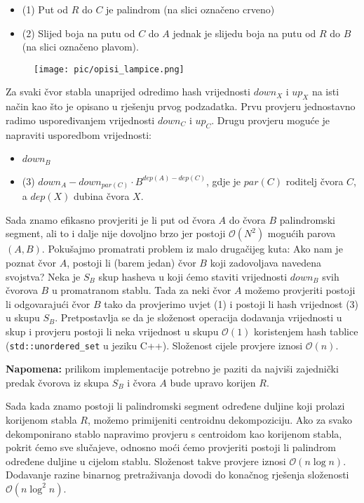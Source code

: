 \documentclass[a4paper]{article}
\begin{document}
\begin{itemize}
  \item (1) Put od $R$ do $C$ je palindrom (na slici označeno crveno)
  \item (2) Slijed boja na putu od $C$ do $A$ jednak je slijedu boja na putu od $R$
    do $B$ (na slici označeno plavom).
\end{itemize}

\begin{figure}[!htbp]
\centering
\texttt{[image: pic/opisi\_lampice.png]}
\end{figure}

Za svaki čvor stabla unaprijed odredimo hash vrijednosti $down_X$ i $up_X$ na
isti način kao što je opisano u rješenju prvog podzadatka. Prvu provjeru
jednostavno radimo uspoređivanjem vrijednosti $down_C$ i $up_C$. Drugu provjeru
moguće je napraviti usporedbom vrijednosti:

\begin{itemize}
  \item $down_B$
  \item (3) $down_A - down_{par(C)} \cdot B^{dep(A)-dep(C)}$, gdje je $par(C)$ roditelj
        čvora $C$, a $dep(X)$ dubina čvora $X$.
\end{itemize}

Sada znamo efikasno provjeriti je li put od čvora $A$ do čvora $B$ palindromski
segment, ali to i dalje nije dovoljno brzo jer postoji $\mathcal{O}(N^2)$
mogućih parova $(A, B)$. Pokušajmo promatrati problem iz malo drugačijeg kuta:
Ako nam je poznat čvor $A$, postoji li (barem jedan) čvor $B$ koji zadovoljava
navedena svojstva?  Neka je $S_B$ skup hasheva u koji ćemo staviti vrijednosti
$down_B$ svih čvorova $B$ u promatranom stablu. Tada za neki čvor $A$ možemo
provjeriti postoji li odgovarajući čvor $B$ tako da provjerimo uvjet (1) i
postoji li hash vrijednost (3) u skupu $S_B$. Pretpostavlja se da je složenost
operacija dodavanja vrijednosti u skup i provjeru postoji li neka vrijednost u
skupu $\mathcal{O}(1)$ koristenjem hash tablice (\texttt{std::unordered\_set} u
jeziku C++). Složenost cijele provjere iznosi $\mathcal{O}(n)$.

\textbf{Napomena:} prilikom implementacije potrebno je paziti da najviši
zajednički predak čvorova iz skupa $S_B$ i čvora $A$ bude upravo korijen $R$.

Sada kada znamo postoji li palindromski segment određene duljine koji prolazi
korijenom stabla $R$, možemo primijeniti centroidnu dekompoziciju. Ako za svako
dekomponirano stablo napravimo provjeru s centroidom kao korijenom stabla,
pokrit ćemo sve slučajeve, odnosno moći ćemo provjeriti postoji li palindrom
određene duljine u cijelom stablu. Složenost takve provjere iznosi $\mathcal{O}(n \log n)$.
Dodavanje razine binarnog pretraživanja dovodi do konačnog rješenja složenosti
$\mathcal{O}(n \log^2 n)$.
\end{document}
